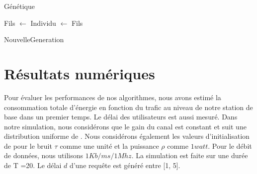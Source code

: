 \documentclass[runningheads]{llncs}
\begin{document}
\begin{algorithm}[H]
    \caption{Génétique}%
    \label{alg:genetic}
    \begin{algorithmic}[1]
                \State Fils $ \gets  $
                \State Individu $\gets $ Fils
                \EndIf{}
            \EndFor{}
        \EndWhile{}

    \State {}
    
    \end{algorithmic}
\end{algorithm}
\begin{algorithm}[H]
    \caption{NouvelleGeneration}%
    \label{alg:ngeneration}
    \begin{algorithmic}[1]
    \State {}
    
    \end{algorithmic}
\end{algorithm}



\section{R\'esultats num\'eriques}
Pour évaluer les performances de nos algorithmes, nous avons estimé la 
consommation totale d'énergie en fonction du trafic au niveau de notre station de 
base dans un premier temps. Le délai des utilisateurs est aussi mesur\'e.
Dans notre simulation, nous considérons que le gain du canal est constant 
et suit une distribution uniforme de \cite{huang2016}.
Nous considérons également les valeurs d'initialisation de \cite{huang2016} 
pour le bruit $ \tau $ comme une unité et la puissance $ \rho $ comme 
$ 1 watt $. Pour le débit de données, nous utilisons $1Kb/ms/1Mhz$.
La simulation est faite sur une durée de T =20. 
Le délai $d$ d'une requête est généré entre [1, 5].
\end{document}
